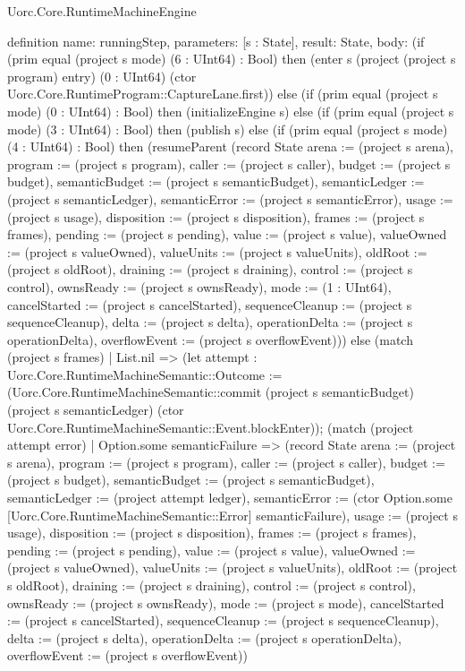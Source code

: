 \begin{lexlean}{Uorc.Core.RuntimeMachineEngine}
\begin{semanticmodule}
definition{
  name: runningStep,
  parameters: [s : State],
  result: State,
  body: (if (prim equal (project s mode) (6 : UInt64) : Bool) then (enter s (project (project s program) entry) (0 : UInt64) (ctor Uorc.Core.RuntimeProgram::CaptureLane.first)) else (if (prim equal (project s mode) (0 : UInt64) : Bool) then (initializeEngine s) else (if (prim equal (project s mode) (3 : UInt64) : Bool) then (publish s) else (if (prim equal (project s mode) (4 : UInt64) : Bool) then (resumeParent (record State {arena := (project s arena), program := (project s program), caller := (project s caller), budget := (project s budget), semanticBudget := (project s semanticBudget), semanticLedger := (project s semanticLedger), semanticError := (project s semanticError), usage := (project s usage), disposition := (project s disposition), frames := (project s frames), pending := (project s pending), value := (project s value), valueOwned := (project s valueOwned), valueUnits := (project s valueUnits), oldRoot := (project s oldRoot), draining := (project s draining), control := (project s control), ownsReady := (project s ownsReady), mode := (1 : UInt64), cancelStarted := (project s cancelStarted), sequenceCleanup := (project s sequenceCleanup), delta := (project s delta), operationDelta := (project s operationDelta), overflowEvent := (project s overflowEvent)})) else (match (project s frames)
    | List.nil => (let attempt : Uorc.Core.RuntimeMachineSemantic::Outcome := (Uorc.Core.RuntimeMachineSemantic::commit (project s semanticBudget) (project s semanticLedger) (ctor Uorc.Core.RuntimeMachineSemantic::Event.blockEnter)); (match (project attempt error)
      | Option.some semanticFailure => (record State {arena := (project s arena), program := (project s program), caller := (project s caller), budget := (project s budget), semanticBudget := (project s semanticBudget), semanticLedger := (project attempt ledger), semanticError := (ctor Option.some [Uorc.Core.RuntimeMachineSemantic::Error] semanticFailure), usage := (project s usage), disposition := (project s disposition), frames := (project s frames), pending := (project s pending), value := (project s value), valueOwned := (project s valueOwned), valueUnits := (project s valueUnits), oldRoot := (project s oldRoot), draining := (project s draining), control := (project s control), ownsReady := (project s ownsReady), mode := (project s mode), cancelStarted := (project s cancelStarted), sequenceCleanup := (project s sequenceCleanup), delta := (project s delta), operationDelta := (project s operationDelta), overflowEvent := (project s overflowEvent)})
}
\end{semanticmodule}
\end{lexlean}
